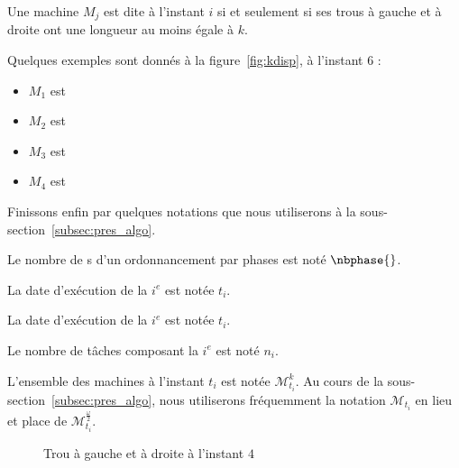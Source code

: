\documentclass[a4paper,9pt]{article}
\begin{document}
\begin{ndf}
    Une machine $M_j$ est dite  à l'instant $i$ si et seulement si ses trous à gauche et à
    droite ont une longueur au moins égale à $k$.

    Quelques exemples sont donnés à la figure~\ref{fig:kdisp}, à l'instant $6$ : 
    \begin{itemize}
        \item $M_1$ est 
        \item $M_2$ est 
        \item $M_3$ est 
        \item $M_4$ est \authmach{\infty}
    \end{itemize}
\end{ndf}

Finissons enfin par quelques notations que nous utiliserons à la
sous-section~\ref{subsec:pres_algo}.

\begin{nnot}
    Le nombre de \tphase{}s d'un ordonnancement par phases est noté $\nbphase{}$.
\end{nnot}

\begin{nnot}
    La date d'exécution de la $i^e$ \tphase{} est notée $t_i$.
\end{nnot}

\begin{nnot}
    La date d'exécution de la $i^e$ \tphase{} est notée $t_i$.
\end{nnot}

\begin{nnot}
    Le nombre de tâches composant la $i^e$ \tphase{} est noté $n_i$.
\end{nnot}

\begin{nnot}
    L'ensemble des machines  à l'instant $t_i$ est notée $\mathcal{M}^{k}_{t_i}$. Au cours
    de la sous-section~\ref{subsec:pres_algo}, nous utiliserons fréquemment la notation
    $\mathcal{M}_{t_i}$ en lieu et place de $\mathcal{M}_{t_i}^{\frac{\omega}{2}}$.
\end{nnot}

\begin{figure}
    \centering
    \begin{ordo}[10]{1}{1}{12}
    \end{ordo}
    \caption{Trou à gauche et à droite à l'instant $4$}
    \label{fig:tagtad}
\end{figure}
\end{document}
